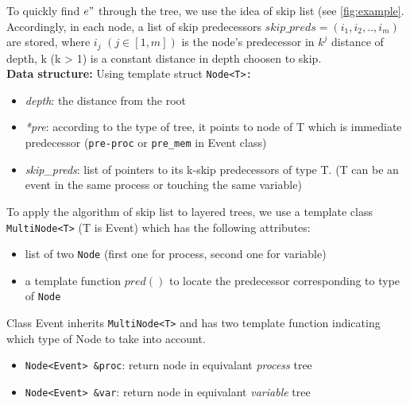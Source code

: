 \documentclass{llncs}
\begin{document}
	
To quickly find $e"$ through the tree, we use the idea of skip list (see \ref{fig:example}. Accordingly, in each node, a list of skip predecessors $ skip\_preds = (i_1, i_2,..,i_m)$ are stored, where $i_j$ $(j \in [1,m] )$ is the node's predecessor in $k^{j}$ distance of depth, k (k > 1) is a constant distance in depth choosen to skip.\\

\noindent
\textbf{Data structure:}
Using template struct \verb!Node<T>:!
\begin{itemize}
	\item \textit{depth}: the distance from the root
	\item \textit{*pre}: according to the type of tree, it points to node of T which is immediate predecessor (\verb!pre-proc! or \verb!pre_mem! in Event class)
	\item \textit{skip\_preds}: list of pointers to its k-skip predecessors of type T.	
(T can be an event in the same process or touching the same variable)
\end{itemize}

To apply the algorithm of skip list to layered trees, we use a template class \verb!MultiNode<T>! (T is Event) which has the following attributes:
\begin{itemize}
	\item list of two \verb!Node! (first one for process, second one for variable)
	\item a template function $pred()$ to locate the predecessor corresponding to type of \verb!Node!
\end{itemize}
 
 Class Event inherits \verb!MultiNode<T>! and has two template function indicating which type of Node to take into account.
\begin{itemize}
\item	
	\verb!Node<Event> &proc!: return node in equivalant \textit{process} tree
\item	
	\verb!Node<Event> &var!: return node in equivalant \textit{variable} tree 	
\end{itemize}
\end{document}
